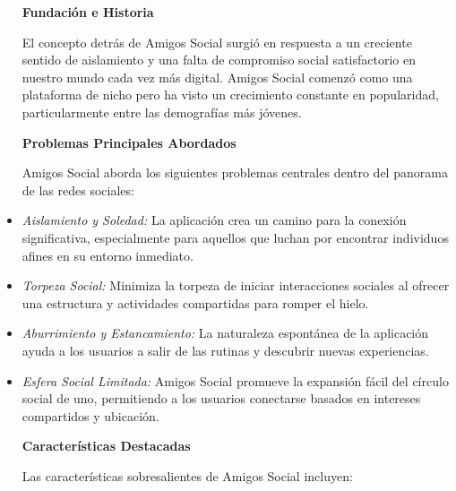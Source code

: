 \begin{itemize}
\textbf{Fundación e Historia}

El concepto detrás de Amigos Social surgió en respuesta a un creciente sentido de aislamiento y una falta de compromiso social 
satisfactorio en nuestro mundo cada vez más digital. Amigos Social comenzó como una plataforma de nicho pero ha visto un crecimiento constante en popularidad, particularmente entre las demografías más jóvenes.


\textbf{Problemas Principales Abordados}

Amigos Social aborda los siguientes problemas centrales dentro del panorama de las redes sociales:

\item \textit{Aislamiento y Soledad:} La aplicación crea un camino para la conexión significativa, especialmente para aquellos que luchan por encontrar individuos afines en su entorno inmediato.
\item \textit{Torpeza Social:} Minimiza la torpeza de iniciar interacciones sociales al ofrecer una estructura y actividades compartidas para romper el hielo.
\item \textit{Aburrimiento y Estancamiento:} La naturaleza espontánea de la aplicación ayuda a los usuarios a salir de las rutinas y descubrir nuevas experiencias.
\item \textit{Esfera Social Limitada:} Amigos Social promueve la expansión fácil del círculo social de uno, permitiendo a los usuarios conectarse basados en intereses compartidos y ubicación.

\textbf{Características Destacadas}

Las características sobresalientes de Amigos Social incluyen:


\end{itemize}
